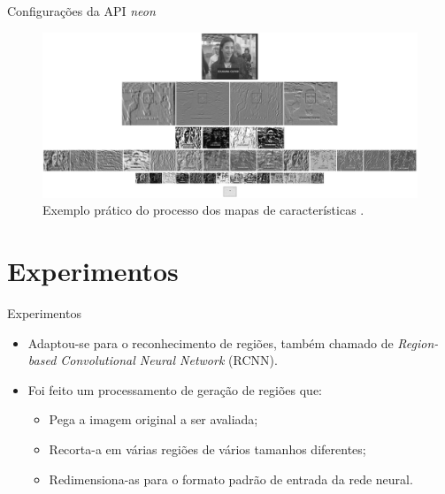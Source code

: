 \documentclass[aspectratio=169, xcolor=dvipsnames]{beamer}
\let\olditem=\item%
\renewcommand{\item}{\olditem \justifying}
\begin{document}
		\begin{frame}{Configurações da API \textit{neon}}
			\begin{figure}[h]
				\centering
				\includegraphics[width=1.0\linewidth]{img/archtecture.png}
				\caption{Exemplo prático do processo dos mapas de características \cite{Garcia2004}.}
				\label{fig:mapa}
			\end{figure}
		\end{frame}
	
\section{Experimentos}
	\begin{frame}{Experimentos}
		\begin{itemize}
			\setlength\itemsep{1em}
			\item Adaptou-se para o reconhecimento de regiões, também chamado de \textit{Region-based Convolutional Neural Network} (RCNN).
			
			\bigskip
			
			\item Foi feito um processamento de geração de regiões que:
			\begin{itemize}
				\setlength\itemsep{0.5em}
				\item Pega a imagem original a ser avaliada;
				\item Recorta-a em várias regiões de vários tamanhos diferentes;
				\item Redimensiona-as para o formato padrão de entrada da rede neural.
			\end{itemize}
		\end{itemize}
	\end{frame}
\end{document}
